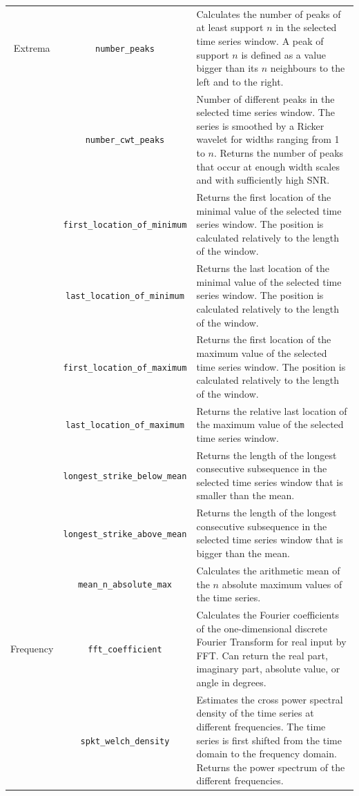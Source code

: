 \documentclass[11pt]{article}
\begin{document}
\begin{table}[htbp]
{\begin{tabular}{ccp{14cm}}
\midrule
Extrema
  & \texttt{number\_peaks} & Calculates the number of peaks of at least support $n$ in the selected time series window. A peak of support $n$ is defined as a value bigger than its $n$ neighbours to the left and to the right. \\
  & \texttt{number\_cwt\_peaks} & Number of different peaks in the selected time series window. The series is smoothed by a Ricker wavelet for widths ranging from 1 to $n$. Returns the number of peaks that occur at enough width scales and with sufficiently high SNR. \\
  & \texttt{first\_location\_of\_minimum} & Returns the first location of the minimal value of the selected time series window. The position is calculated relatively to the length of the window. \\
  & \texttt{last\_location\_of\_minimum} & Returns the last location of the minimal value of the selected time series window. The position is calculated relatively to the length of the window. \\
  & \texttt{first\_location\_of\_maximum} & Returns the first location of the maximum value of the selected time series window. The position is calculated relatively to the length of the window. \\
  & \texttt{last\_location\_of\_maximum} & Returns the relative last location of the maximum value of the selected time series window. \\
  & \texttt{longest\_strike\_below\_mean} & Returns the length of the longest consecutive subsequence in the selected time series window that is smaller than the mean. \\
  & \texttt{longest\_strike\_above\_mean} & Returns the length of the longest consecutive subsequence in the selected time series window that is bigger than the mean. \\
  & \texttt{mean\_n\_absolute\_max} & Calculates the arithmetic mean of the $n$ absolute maximum values of the time series. \\
\midrule
Frequency
  & \texttt{fft\_coefficient} & Calculates the Fourier coefficients of the one-dimensional discrete Fourier Transform for real input by FFT. Can return the real part, imaginary part, absolute value, or angle in degrees. \\
  & \texttt{spkt\_welch\_density} & Estimates the cross power spectral density of the time series at different frequencies. The time series is first shifted from the time domain to the frequency domain. Returns the power spectrum of the different frequencies. \\

\end{tabular}}
\end{table}
\end{document}
